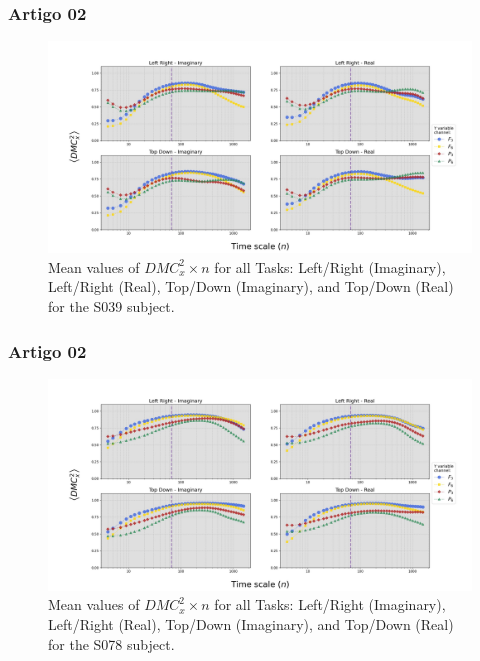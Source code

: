 \documentclass[11pt, aspectratio=169]{beamer}
\begin{document}
\begin{frame}
  \frametitle{Artigo 02}

  \begin{figure}[!h]
    \includegraphics[height=.5\paperheight]{../Figures/art_02/Fig5.jpg}
    \caption{Mean values of $DMC_{x}^{2} \times n$ for all Tasks: Left/Right (Imaginary), Left/Right (Real), Top/Down (Imaginary), and Top/Down (Real) for the S039 subject.}
    \label{fig05}
  \end{figure}
\end{frame}


\begin{frame}
  \frametitle{Artigo 02}
  
  \begin{figure}[!h]
    \includegraphics[height=.5\paperheight]{../Figures/art_02/Fig6.jpg}
    \caption{Mean values of $DMC_{x}^{2} \times n$ for all Tasks: Left/Right (Imaginary), Left/Right (Real), Top/Down (Imaginary), and Top/Down (Real) for the S078 subject.}
    \label{fig06}
  \end{figure}
\end{frame}
\end{document}
